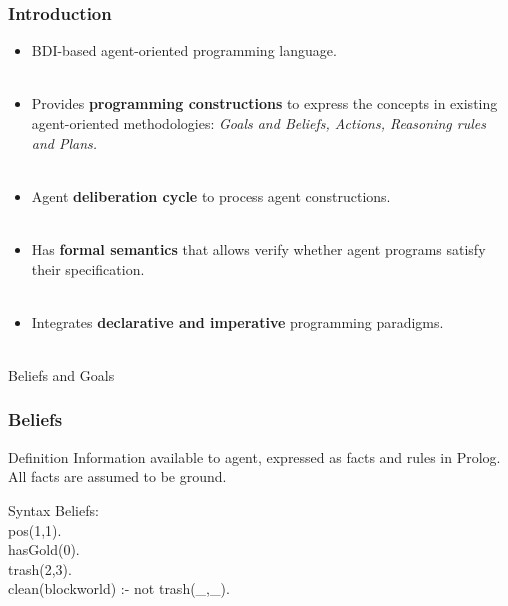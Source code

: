 \documentclass{beamer}
\newcommand\tab[1][1cm]{\hspace*{#1}}
\begin{document}
\begin{frame}
\frametitle{Introduction}
  \begin{itemize}
      \item BDI-based agent-oriented programming language.\\~\\
      
      \item Provides \textbf{programming constructions} to express the concepts in existing agent-oriented methodologies: \textit{Goals and Beliefs, Actions, Reasoning rules and Plans.}\\~\\
      
      \item Agent \textbf{deliberation cycle} to process agent constructions. \\~\\

      \item Has \textbf{formal semantics} that allows verify whether agent programs satisfy their specification.\\~\\
      \item Integrates \textbf{declarative and imperative} programming paradigms.\\~\\
  \end{itemize}
\end{frame}

\begin{frame}
\Huge{\centerline{Beliefs and Goals}}
\end{frame}
\begin{frame}
\frametitle{Beliefs}
\begin{block}{Definition}
	Information available to agent, expressed as facts and rules in Prolog. All facts are assumed to be ground.
\end{block}
\begin{block}{Syntax}
  Beliefs: \\ 
  \tab  pos(1,1).\\
  \tab hasGold(0).\\
  \tab trash(2,3).\\
  \tab clean(blockworld) :- not trash(\_,\_).
\end{block}
\end{frame}
\end{document}
